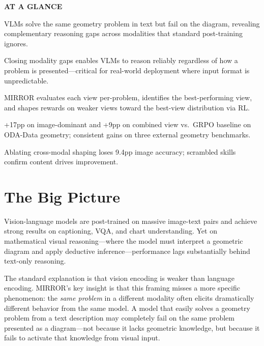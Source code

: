 \documentclass[10pt,twocolumn]{article}
\begin{document}
\begin{mdframed}[backgroundcolor=boxgray,linecolor=rulered,linewidth=1pt,
    innerleftmargin=6pt,innerrightmargin=6pt,
    innertopmargin=6pt,innerbottommargin=6pt]
\textbf{\small AT A GLANCE}\par\vspace{4pt}
\begin{description}[leftmargin=0pt,labelsep=4pt,itemsep=2pt,parsep=0pt,
    font=\small\bfseries]
  \item[Problem:] VLMs solve the same geometry problem in text but
    fail on the diagram, revealing complementary reasoning gaps across
    modalities that standard post-training ignores.
  \item[Why it matters:] Closing modality gaps enables VLMs to reason
    reliably regardless of how a problem is presented---critical for
    real-world deployment where input format is unpredictable.
  \item[Method:] MIRROR evaluates each view per-problem, identifies
    the best-performing view, and shapes rewards on weaker views
    toward the best-view distribution via RL.
  \item[Result:] +17pp on image-dominant and +9pp on combined view
    vs.\ GRPO baseline on ODA-Data geometry; consistent gains on
    three external geometry benchmarks.
  \item[Evidence:] Ablating cross-modal shaping loses 9.4pp image
    accuracy; scrambled skills confirm content drives improvement.
\end{description}
\end{mdframed}

\section{The Big Picture}

Vision-language models are post-trained on massive image-text pairs
and achieve strong results on captioning, VQA, and chart understanding.
Yet on mathematical visual reasoning---where the model must interpret
a geometric diagram and apply deductive inference---performance lags
substantially behind text-only reasoning.

The standard explanation is that vision encoding is weaker than language
encoding. MIRROR's key insight is that this framing misses a more
specific phenomenon: the \emph{same problem} in a different modality
often elicits dramatically different behavior from the same model.
A model that easily solves a geometry problem from a text description
may completely fail on the same problem presented as a diagram---not
because it lacks geometric knowledge, but because it fails to activate
that knowledge from visual input.
\end{document}

